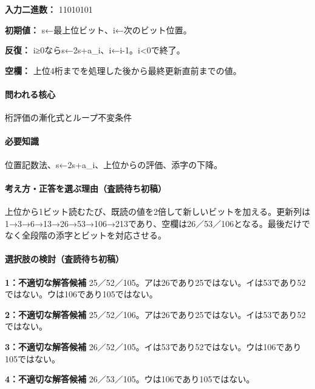 \noindent\textbf{入力二進数：} 11010101\par

\noindent\textbf{初期値：} s←最上位ビット、i←次のビット位置。\par

\noindent\textbf{反復：} i≥0ならs←2s+a\_i、i←i-1。i<0で終了。\par

\noindent\textbf{空欄：} 上位4桁までを処理した後から最終更新直前までの値。\par

\paragraph{問われる核心} 桁評価の漸化式とループ不変条件

\paragraph{必要知識} 位置記数法、s←2s+a\_i、上位からの評価、添字の下降。

\paragraph{考え方・正答を選ぶ理由（査読待ち初稿）} 上位から1ビット読むたび、既読の値を2倍して新しいビットを加える。更新列は1→3→6→13→26→53→106→213であり、空欄は26／53／106となる。最後だけでなく全段階の添字とビットを対応させる。

\paragraph{選択肢の検討（査読待ち初稿）}\mbox{}\par

\noindent\textbf{1：不適切な解答候補} 25／52／105。アは26であり25ではない。イは53であり52ではない。ウは106であり105ではない。\par

\noindent\textbf{2：不適切な解答候補} 25／52／106。アは26であり25ではない。イは53であり52ではない。\par

\noindent\textbf{3：不適切な解答候補} 26／52／105。イは53であり52ではない。ウは106であり105ではない。\par

\noindent\textbf{4：不適切な解答候補} 26／53／105。ウは106であり105ではない。\par

